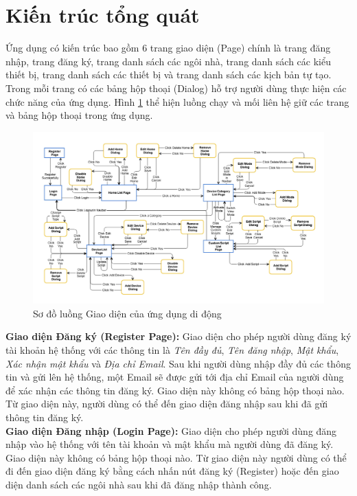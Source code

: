 \documentclass[12pt,a4paper,oneside]{extbook}
\begin{document}
\section{Kiến trúc tổng quát}
Ứng dụng có kiến trúc bao gồm 6 trang giao diện (Page) chính là trang đăng nhập, trang đăng ký, trang danh sách các ngôi nhà, trang danh sách các kiểu thiết bị, trang danh sách các thiết bị và trang danh sách các kịch bản tự tạo. Trong mỗi trang có các bảng hộp thoại (Dialog) hỗ trợ người dùng thực hiện các chức năng của ứng dụng. Hình \ref{fig:5-UI-Flow} thể hiện luồng chạy và mối liên hệ giữ các trang và bảng hộp thoại trong ứng dụng.

\begin{figure}[h]
  \centering
     \includegraphics[width=16cm]{5-UI-Flow}
  \caption{Sơ đồ luồng Giao diện của ứng dụng di động}\label{fig:5-UI-Flow}
\end{figure}

\noindent
\textbf{Giao diện Đăng ký (Register Page):} Giao diện cho phép người dùng đăng ký tài khoản hệ thống với các thông tin là \textit{Tên đầy đủ}, \textit{Tên đăng nhập}, \textit{Mật khẩu}, \textit{Xác nhận mật khẩu} và \textit{Địa chỉ Email}. Sau khi người dùng nhập đầy đủ các thông tin và gửi lên hệ thống, một Email sẽ được gửi tới địa chỉ Email của người dùng để xác nhận các thông tin đăng ký. Giao diện này không có bảng hộp thoại nào. Từ giao diện này, người dùng có thể đến giao diện đăng nhập sau khi đã gửi thông tin đăng ký.\\

\noindent
\textbf{Giao diện Đăng nhập (Login Page):} Giao diện cho phép người dùng đăng nhập vào hệ thống với tên tài khoản và mật khẩu mà người dùng đã đăng ký. Giao diện này không có bảng hộp thoại nào. Từ giao diện này người dùng có thể đi đến giao diện đăng ký bằng cách nhấn nút đăng ký (Register) hoặc đến giao diện danh sách các ngôi nhà sau khi đã đăng nhập thành công.\\
\end{document}
